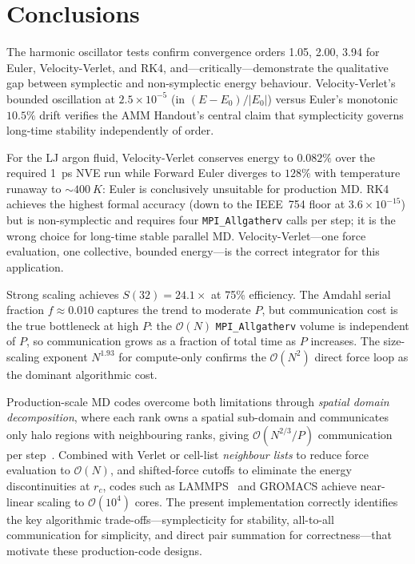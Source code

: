 \documentclass[10pt,twocolumn]{article}
\begin{document}
\section{Conclusions}
\label{sec:conclusions}

The harmonic oscillator tests confirm convergence orders 1.05, 2.00, 3.94
for Euler, Velocity-Verlet, and RK4, and---critically---demonstrate the
qualitative gap between symplectic and non-symplectic energy behaviour.
Velocity-Verlet's bounded oscillation at $2.5\times10^{-5}$ (in $(E-E_0)/|E_0|$)
versus Euler's monotonic $10.5\%$ drift verifies the AMM Handout's central
claim that symplecticity governs long-time stability independently of order.

For the LJ argon fluid, Velocity-Verlet conserves energy to $0.082\%$ over
the required 1~ps NVE run while Forward Euler diverges to $128\%$ with
temperature runaway to $\sim\SI{400}{K}$: Euler is conclusively unsuitable
for production MD.
RK4 achieves the highest formal accuracy (down to the IEEE~754 floor at
$3.6\times10^{-15}$) but is non-symplectic and requires four
\texttt{MPI\_Allgatherv} calls per step; it is the wrong choice for
long-time stable parallel MD.
Velocity-Verlet---one force evaluation, one collective, bounded energy---is
the correct integrator for this application.

Strong scaling achieves $S(32)=24.1\times$ at 75\% efficiency.
The Amdahl serial fraction $f\approx0.010$ captures the trend to moderate $P$,
but communication cost is the true bottleneck at high $P$: the $\mathcal{O}(N)$
\texttt{MPI\_Allgatherv} volume is independent of $P$, so communication
grows as a fraction of total time as $P$ increases.
The size-scaling exponent $N^{1.93}$ for compute-only confirms the
$\mathcal{O}(N^2)$ direct force loop as the dominant algorithmic cost.

Production-scale MD codes overcome both limitations through \emph{spatial
domain decomposition}, where each rank owns a spatial sub-domain and
communicates only halo regions with neighbouring ranks, giving
$\mathcal{O}(N^{2/3}/P)$ communication per step~\citep{AllenTildesley2017}.
Combined with Verlet or cell-list \emph{neighbour lists} to reduce force
evaluation to $\mathcal{O}(N)$, and shifted-force cutoffs to eliminate
the energy discontinuities at $r_c$, codes such as LAMMPS~\citep{Thompson2022}
and GROMACS achieve near-linear scaling to $\mathcal{O}(10^4)$ cores.
The present implementation correctly identifies the key algorithmic
trade-offs---symplecticity for stability, all-to-all communication for
simplicity, and direct pair summation for correctness---that motivate these
production-code designs.
\end{document}
